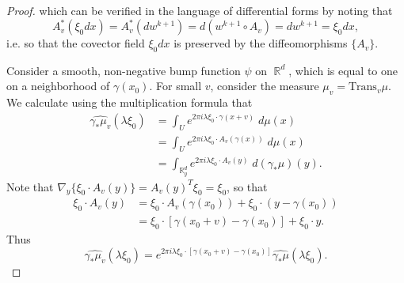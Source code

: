 \documentclass[dvipsnames,letterpaper,12pt]{article}
\DeclareMathOperator{\RR}{\mathbb{R}}
\begin{document}
\begin{proof}



    


    which can be verified in the language of differential forms by noting that
    \[ A_v^*( \xi_0 dx ) = A_v^*(dw^{k+1}) = d( w^{k+1} \circ A_v ) = d w^{k+1} = \xi_0 dx, \]
    i.e. so that the covector field $\xi_0 dx$ is preserved by the diffeomorphisms $\{ A_v \}$.

    Consider a smooth, non-negative bump function $\psi$ on $\RR^d$, which is equal to one on a neighborhood of $\gamma(x_0)$. For small $v$, consider the measure $\mu_v = \text{Trans}_v \mu$. We calculate using the multiplication formula that
    \begin{align*}
        \widehat{\gamma_* \mu_v}(\lambda \xi_0) &= \int_U e^{2 \pi i \lambda \xi_0 \cdot \gamma(x + v)}\; d \mu(x)\\
        &= \int_U e^{2 \pi i \lambda \xi_0 \cdot A_v(\gamma(x))}\; d\mu(x)\\
        &= \int_{\RR^d_y} e^{2 \pi i \lambda \xi_0 \cdot A_v(y)}\; d(\gamma_* \mu)(y).
    \end{align*}
    Note that $\nabla_y \{ \xi_0 \cdot A_v(y) \} = A_v(y)^T \xi_0 = \xi_0$, so that
    \begin{align*}
        \xi_0 \cdot A_v(y) &= \xi_0 \cdot A_v(\gamma(x_0)) + \xi_0 \cdot (y - \gamma(x_0))\\
        &= \xi_0 \cdot [\gamma(x_0 + v) - \gamma(x_0)] + \xi_0 \cdot y.
    \end{align*}
    Thus
    \[ \widehat{\gamma_* \mu_v}(\lambda \xi_0) = e^{2 \pi i \lambda \xi_0 \cdot [\gamma(x_0 + v) - \gamma(x_0)]} \widehat{\gamma_* \mu}(\lambda \xi_0). \]




\end{proof}
\end{document}
